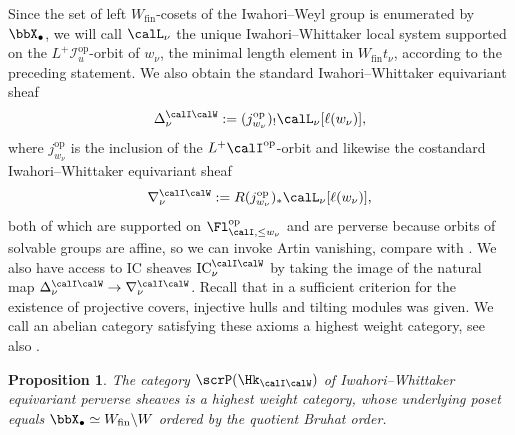 \documentclass[10pt, reqno]{amsart}
\theoremstyle{plain}
\newtheorem{proposition}[theorem]{Proposition}
\theoremstyle{definition}
\numberwithin{equation}{section}
\begin{document}
Since the set of left $W_\mathrm{fin}$-cosets of the Iwahori--Weyl group is enumerated by $\bbX_\bullet$, we will call $\calL_{\nu}$ the unique Iwahori--Whittaker local system supported on the $L^+\mathcal{I}_u^{\mathrm{op}}$-orbit of $w_\nu$, the minimal length element in $W_\mathrm{fin}t_{\nu}$, according to the preceding statement. 
We also obtain the standard Iwahori--Whittaker equivariant sheaf
\begin{equation}
	\Delta_\nu^{\calI\calW} := (j^{\mathrm{op}}_{w_\nu})_!\calL_{\nu}[\ell(w_\nu)],
\end{equation}
where $j^{\mathrm{op}}_{w_\nu}$ is the inclusion of the $L^+\calI^{\mathrm{op}}$-orbit and likewise the costandard Iwahori--Whittaker equivariant sheaf
\begin{equation}
	\nabla_\nu^{\calI\calW} := R(j^{\mathrm{op}}_{w_\nu})_*\calL_{\nu}[\ell(w_\nu)],
\end{equation}
both of which are supported on $\Fl_{\calI,\leq w_\nu}^{\mathrm{op}}$ and are perverse because orbits of solvable groups are affine, so we can invoke Artin vanishing, compare with \cite[Corollaire 4.1.10]{BBDG18}. We also have access to $\mathrm{IC}$ sheaves $\mathrm{IC}_\nu^{\calI\calW}$ by taking the image of the natural map $\Delta_\nu^{\calI\calW} \to \nabla_\nu^{\calI\calW}$. Recall that in \cite[Subsection 3.2]{BGS96} a sufficient criterion for the existence of projective covers, injective hulls and tilting modules was given. We call an abelian category satisfying these axioms a highest weight category, see also \cite[Subsection 1.12.3]{BR18}.

\begin{proposition}\label{prop_IW_category_is_highest_weight}
	The category $\scrP(\Hk_{\calI\calW})$ of Iwahori--Whittaker equivariant perverse sheaves is a highest weight category, whose underlying poset equals $\bbX_\bullet \simeq W_{\mathrm{fin}}\backslash W$ ordered by the quotient Bruhat order.
\end{proposition}
\end{document}
